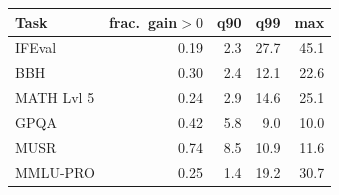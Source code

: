 \begin{tabular}{lrrrr}\toprule
Task & frac.\ gain$>0$ & q90 & q99 & max\\\midrule
IFEval & 0.19 & 2.3 & 27.7 & 45.1\\
BBH & 0.30 & 2.4 & 12.1 & 22.6\\
MATH Lvl 5 & 0.24 & 2.9 & 14.6 & 25.1\\
GPQA & 0.42 & 5.8 & 9.0 & 10.0\\
MUSR & 0.74 & 8.5 & 10.9 & 11.6\\
MMLU-PRO & 0.25 & 1.4 & 19.2 & 30.7\\
\bottomrule\end{tabular}
